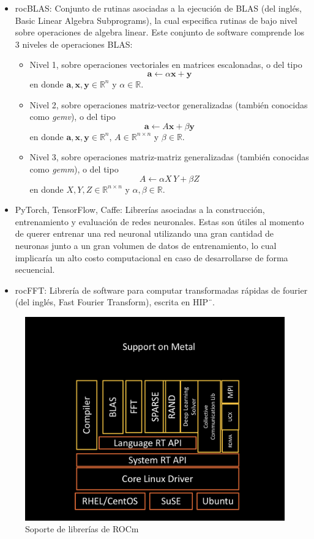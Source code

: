 \begin{itemize}
    \item rocBLAS: Conjunto de rutinas asociadas a la ejecución de BLAS (del inglés, Basic Linear Algebra Subprograms), la cual especifica rutinas de bajo nivel sobre operaciones de algebra linear. Este conjunto de software comprende los 3 niveles de operaciones BLAS:
    \begin{itemize}
        \item Nivel 1, sobre operaciones vectoriales en matrices escalonadas, o del tipo 
        \begin{equation*}
            \mathbf{a}\leftarrow \alpha \mathbf{x} + \mathbf{y}
        \end{equation*}
        en donde $\mathbf{a},\mathbf{x},\mathbf{y} \in \mathbb{R}^{n}$ y $\alpha \in \mathbb{R}$.
        \item Nivel 2, sobre operaciones matriz-vector generalizadas (también conocidas como \textit{gemv}), o del tipo
        \begin{equation*}
            \mathbf{a} \leftarrow A\mathbf{x} + \beta \mathbf{y}
        \end{equation*}
        en donde $\mathbf{a},\mathbf{x},\mathbf{y} \in \mathbb{R}^n$, $A \in \mathbb{R}^{n\times n}$ y $\beta \in \mathbb{R}$.
        \item Nivel 3, sobre operaciones matriz-matriz generalizadas (también conocidas como \textit{gemm}), o del tipo
        \begin{equation*}
            A \leftarrow \alpha X\,Y + \beta Z
        \end{equation*}
        en donde $X,Y,Z \in \mathbb{R}^{n\times n}$ y $\alpha,\beta \in \mathbb{R}$.
    \end{itemize}
    \item PyTorch, TensorFlow, Caffe: Librerías asociadas a la construcción, entrenamiento y evaluación de redes neuronales. 
    Estas son útiles al momento de querer entrenar una red neuronal utilizando una gran cantidad de neuronas junto a un gran volumen de datos de entrenamiento, lo cual implicaría un alto costo computacional en caso de desarrollarse de forma secuencial.
    \item rocFFT: Librería de software para computar transformadas rápidas de fourier (del inglés, Fast Fourier Transform), escrita en HIP¨.
\end{itemize}

\begin{figure}[ht]
    \centering
    \includegraphics[height=.4\textwidth]{Figures/library.png}
    \caption{Soporte de librerías de ROCm}
    \label{fig:3}
\end{figure}

